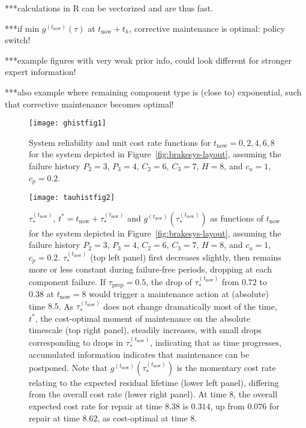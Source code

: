 \documentclass[authoryear]{elsarticle}
\def\tnow{t_\text{now}}
\newcommand{\gnow}{g^{(\tnow)}}
\newcommand{\tausnow}{\tau_*^{(\tnow)}}
\newcommand{\tprep}{\tau_{\text{prep}}}
\begin{document}
***calculations in \textsf{R} can be vectorized and are thus fast.

***if min $\gnow(\tau)$ at $\tnow + t_h$, corrective maintenance is optimal: policy switch!



***example figures with very weak prior info, could look different for stronger expert information!

***also example where remaining component type is (close to) exponential,
such that corrective maintenance becomes optimal!

\begin{figure}
\texttt{[image: ghistfig1]}
\caption{System reliability and unit cost rate functions for $\tnow = 0,2,4,6,8$
for the system depicted in Figure~\ref{fig:brakesys-layout},
assuming the failure history $P_2 = 3$, $P_3 = 4$, $C_2 = 6$, $C_3 = 7$, $H = 8$,
and $c_u = 1$, $c_p = 0.2$.}
\label{fig:ghistfig1}
\end{figure}

\begin{figure}
\texttt{[image: tauhistfig2]}
\caption{$\tausnow$, $t^* = \tnow + \tausnow$ and $\gnow(\tausnow)$ as functions of $\tnow$
for the system depicted in Figure~\ref{fig:brakesys-layout},
assuming the failure history $P_2 = 3$, $P_3 = 4$, $C_2 = 6$, $C_3 = 7$, $H = 8$,
and $c_u = 1$, $c_p = 0.2$.
$\tausnow$ (top left panel) first decreases slightly, then remains more or less constant during failure-free periods,
dropping at each component failure.
If $\tprep = 0.5$, the drop of $\tausnow$ from $0.72$ to $0.38$ at $\tnow = 8$ would trigger a maintenance action
at (absolute) time $8.5$.
As $\tausnow$ does not change dramatically most of the time, $t^*$,
the cost-optimal moment of maintenance on the absolute timescale (top right panel),
steadily increases, with small drops corresponding to drops in $\tausnow$,
indicating that as time progresses, accumulated information indicates that maintenance can be postponed.
Note that $\gnow(\tausnow)$ is the momentary cost rate relating to the expected residual lifetime (lower left panel),
differing from the overall cost rate (lower right panel).
At time $8$, the overall expected cost rate for repair at time $8.38$ is $0.314$,
up from $0.076$ for repair at time $8.62$, as cost-optimal at time $8$.}
\label{fig:tauhistfig2}
\end{figure}
\end{document}
